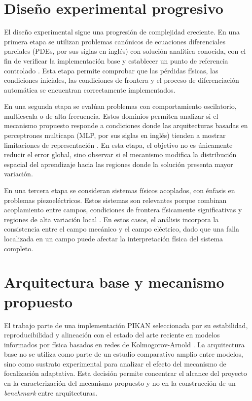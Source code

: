\section{Diseño experimental progresivo}
\label{subsec:diseno-experimental}

El diseño experimental sigue una progresión de complejidad creciente. En una primera etapa se utilizan problemas canónicos de ecuaciones diferenciales parciales (PDEs, por sus siglas en inglés) con solución analítica conocida, con el fin de verificar la implementación base y establecer un punto de referencia controlado \cite{lagaris1998,raissi2019,grossmann2024}. Esta etapa permite comprobar que las pérdidas físicas, las condiciones iniciales, las condiciones de frontera y el proceso de diferenciación automática se encuentran correctamente implementados.

En una segunda etapa se evalúan problemas con comportamiento oscilatorio, multiescala o de alta frecuencia. Estos dominios permiten analizar si el mecanismo propuesto responde a condiciones donde las arquitecturas basadas en perceptrones multicapa (MLP, por sus siglas en inglés) tienden a mostrar limitaciones de representación \cite{rahaman2019,tancik2020,wang2021eigenvector}. En esta etapa, el objetivo no es únicamente reducir el error global, sino observar si el mecanismo modifica la distribución espacial del aprendizaje hacia las regiones donde la solución presenta mayor variación.

En una tercera etapa se consideran sistemas físicos acoplados, con énfasis en problemas piezoeléctricos. Estos sistemas son relevantes porque combinan acoplamiento entre campos, condiciones de frontera físicamente significativas y regiones de alta variación local \cite{mehtaj2025scimlwaves,tandis2025piezoelectric,mouratidou2026shunted}. En estos casos, el análisis incorpora la consistencia entre el campo mecánico y el campo eléctrico, dado que una falla localizada en un campo puede afectar la interpretación física del sistema completo.

\section{Arquitectura base y mecanismo propuesto}
\label{subsec:arquitectura-base-mecanismo}

El trabajo parte de una implementación PIKAN seleccionada por su estabilidad, reproducibilidad y alineación con el estado del arte reciente en modelos informados por física basados en redes de Kolmogorov-Arnold \cite{toscano2025pikans,shukla2024fair,wang2025kinn}. La arquitectura base no se utiliza como parte de un estudio comparativo amplio entre modelos, sino como sustrato experimental para analizar el efecto del mecanismo de focalización adaptativa. Esta decisión permite concentrar el alcance del proyecto en la caracterización del mecanismo propuesto y no en la construcción de un \textit{benchmark} entre arquitecturas.

